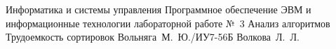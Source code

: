 \documentclass{bmstu}
\begin{document}
\makereporttitle
	{Информатика и системы управления} %
	{Программное обеспечение ЭВМ и информационные технологии} %
	{лабораторной работе №~3} %
	{Анализ алгоритмов} %
	{Трудоемкость сортировок} %
	{} %
	{Вольняга~М.~Ю./ИУ7-56Б} %
	{Волкова~Л.~Л.} %

\maketableofcontents

%







\makebibliography
\end{document}
